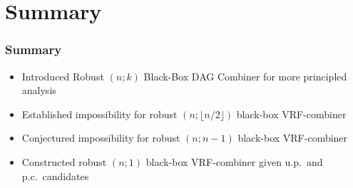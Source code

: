 \section{Summary}

\begin{frame}
    \frametitle{Summary}
    \begin{itemize}
        \item<1-> Introduced Robust $(n;k)$ Black-Box DAG Combiner for more principled analysis
        \item<2-> Established impossibility for robust $(n;\lfloor n/2\rfloor)$ black-box VRF-combiner
        \item<3-> Conjectured impossibility for robust $(n;n-1)$ black-box VRF-combiner
        \item<4-> Constructed robust $(n;1)$ black-box VRF-combiner given u.p.\ and p.c.\ candidates 
    \end{itemize}
\end{frame}